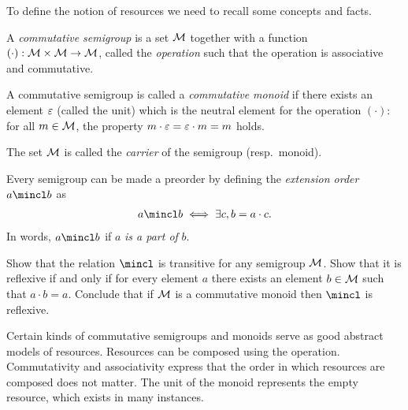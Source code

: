 \newcommand{\valid}{\mathcal{V}}

To define the notion of resources we need to recall some concepts and facts.
\begin{definition}
  A \emph{commutative semigroup} is a set $\mathcal{M}$ together with a function
  $(\cdot) : \mathcal{M} \times \mathcal{M} \to \mathcal{M}$, called the \emph{operation} such that
  the operation is associative and commutative.

  A commutative semigroup is called a \emph{commutative monoid} if there exists an 
  element $\varepsilon$ (called the unit) which is the neutral element for the operation $(\cdot)$: for all
    $m \in \mathcal{M}$, the property $m \cdot \varepsilon = \varepsilon \cdot m = m$ holds.

  The set $\mathcal{M}$ is called the \emph{carrier} of the semigroup (resp.~monoid).
\end{definition}

Every semigroup can be made a preorder by defining the \emph{extension order} $a \mincl b$ as
\begin{align*}
  a \mincl b \iff \exists c, b = a \cdot c.
\end{align*}
In words, $a \mincl b$ if $a$ \emph{is a part of} $b$.
\begin{exercise}
  Show that the relation $\mincl$ is transitive for any semigroup $\mathcal{M}$.
  Show that it is reflexive if and only if for every element $a$ there exists an element $b \in \mathcal{M}$ such that $a \cdot b = a$.
  Conclude that if $\mathcal{M}$ is a commutative monoid then $\mincl$ is reflexive.
\end{exercise}


Certain kinds of commutative semigroups and monoids serve as good abstract models of resources.
Resources can be composed using the operation.
Commutativity and associativity express that the order in which resources are composed does not matter.
The unit of the monoid represents the empty resource, which exists in many instances.

